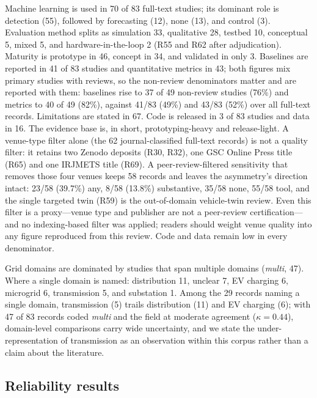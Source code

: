 \documentclass[preprint,12pt]{elsarticle}
\renewcommand{\_}{\plainunderscore\allowbreak}
\begin{document}
Machine learning is used in 70 of 83 full-text studies; its dominant role is detection (55),
followed by forecasting (12), none (13), and control (3). Evaluation method splits as
simulation 33, qualitative 28, testbed 10, conceptual 5, mixed 5, and hardware-in-the-loop 2
(R55 and R62 after adjudication). Maturity is prototype in 46, concept in 34, and
validated in only 3. Baselines are reported in 41 of 83 studies and quantitative metrics in
43; both figures mix primary studies with reviews, so the non-review denominators matter and
are reported with them: baselines rise to 37 of 49 non-review studies (76\%) and metrics to
40 of 49 (82\%), against 41/83 (49\%) and 43/83 (52\%) over all full-text records.
Limitations are stated in 67. Code is released in 3 of 83 studies and data in 16. The
evidence base is, in short, prototyping-heavy and release-light. A venue-type filter
alone (the 62 journal-classified full-text records) is not a quality filter: it retains
two Zenodo deposits (R30, R32), one GSC Online Press title (R65) and one IRJMETS title
(R69). A peer-review-filtered sensitivity that removes those four venues keeps 58
records and leaves the asymmetry's direction intact: 23/58 (39.7\%) any, 8/58 (13.8\%)
substantive, 35/58 none, 55/58 tool, and the single targeted twin (R59) is the
out-of-domain vehicle-twin review. Even this filter is a proxy---venue type and publisher
are not a peer-review certification---and no indexing-based filter was applied; readers
should weight venue quality into any figure reproduced from this review. Code and data
remain low in every denominator.

Grid domains are dominated by studies that span multiple domains (\emph{multi}, 47). Where a
single domain is named: distribution 11, unclear 7, EV charging 6, microgrid 6, transmission 5,
and substation 1. Among the 29 records naming a single domain, transmission (5) trails
distribution (11) and EV charging (6); with 47 of 83 records coded \emph{multi} and the field
at moderate agreement ($\kappa = 0.44$), domain-level comparisons carry wide uncertainty, and
we state the under-representation of transmission as an observation within this corpus rather
than a claim about the literature.

\subsection{Reliability results}
\end{document}
